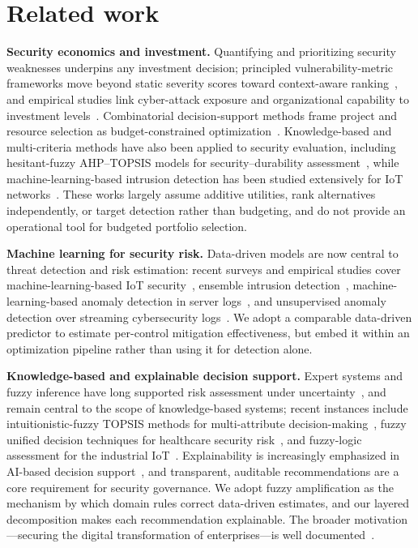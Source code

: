 \documentclass[preprint,12pt]{elsarticle}
\begin{document}
\section{Related work}
\label{sec:related}
\textbf{Security economics and investment.} Quantifying and prioritizing security
weaknesses underpins any investment decision; principled vulnerability-metric frameworks
move beyond static severity scores toward context-aware ranking~\cite{gordon2002}, and
empirical studies link cyber-attack exposure and organizational capability to investment
levels~\cite{bier2007}. Combinatorial decision-support methods frame project and resource
selection as budget-constrained optimization~\cite{grossklags2008}. Knowledge-based and
multi-criteria methods have also been applied to security evaluation, including
hesitant-fuzzy AHP--TOPSIS models for security--durability assessment~\cite{kumar2020},
while machine-learning-based intrusion detection has been studied extensively for IoT
networks~\cite{ighravwe2026}. These works largely assume additive utilities, rank
alternatives independently, or target detection rather than budgeting, and do not
provide an operational tool for budgeted portfolio selection.

\textbf{Machine learning for security risk.} Data-driven models are now central to
threat detection and risk estimation: recent surveys and empirical studies cover
machine-learning-based IoT security~\cite{almars2025}, ensemble intrusion
detection~\cite{gyamfi2024}, machine-learning-based anomaly detection in server
logs~\cite{alsulami2024}, and unsupervised anomaly detection over streaming cybersecurity
logs~\cite{humayun2023}. We adopt a comparable data-driven predictor to estimate
per-control mitigation effectiveness, but embed it within an optimization pipeline rather
than using it for detection alone.

\textbf{Knowledge-based and explainable decision support.} Expert systems and fuzzy
inference have long supported risk assessment under
uncertainty~\cite{mohammadi2020,zadeh1965}, and remain central to the scope of
knowledge-based systems; recent instances include intuitionistic-fuzzy TOPSIS methods
for multi-attribute decision-making~\cite{layeb2011}, fuzzy unified decision techniques
for healthcare security risk~\cite{ansari2023}, and fuzzy-logic assessment for the
industrial IoT~\cite{bolgova2023}. Explainability is increasingly emphasized in AI-based decision
support~\cite{chakraborty2024}, and transparent, auditable recommendations are a core
requirement for security governance. We adopt fuzzy amplification as the mechanism by
which domain rules correct data-driven estimates, and our layered decomposition makes
each recommendation explainable. The broader motivation---securing the digital
transformation of enterprises---is well documented~\cite{teng2024}.
\end{document}

